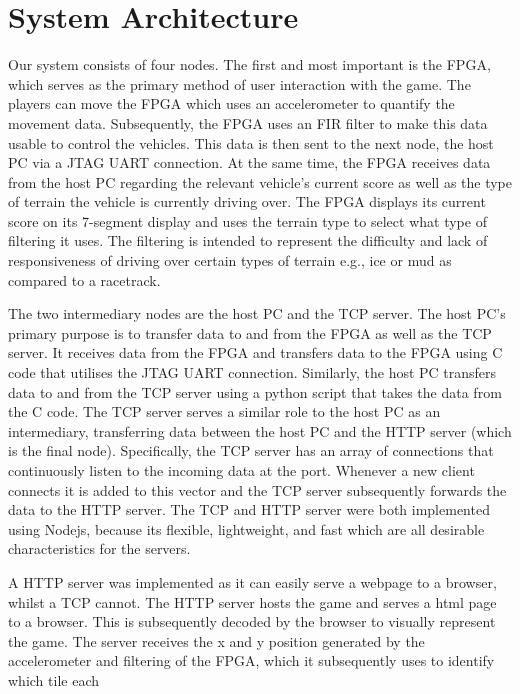 \documentclass[12pt,a4paper]{article}
\begin{document}
\section{\normalsize System Architecture}

{\scriptsize Our system consists of four nodes. The first and most important is the 
FPGA, which serves as the primary method of user interaction with the 
game. The players can move the FPGA which uses an accelerometer to quantify 
the movement data. Subsequently, the FPGA uses an FIR filter to make this 
data usable to control the vehicles. This data is then sent to the next node, 
the host PC via a JTAG UART connection. At the same time, the FPGA receives 
data from the host PC regarding the relevant vehicle’s current score as well 
as the type of terrain the vehicle is currently driving over. The FPGA displays 
its current score on its 7-segment display and uses the terrain type to select 
what type of filtering it uses. The filtering is intended to represent the 
difficulty and lack of responsiveness of driving over certain types of terrain 
e.g., ice or mud as compared to a racetrack.
\par
The two intermediary nodes are the host PC and the TCP server. The host PC’s 
primary purpose is to transfer data to and from the FPGA as well as the TCP 
server. It receives data from the FPGA and transfers data to the FPGA using 
C code that utilises the JTAG UART connection. Similarly, the host PC transfers 
data to and from the TCP server using a python script that takes the data from 
the C code. The TCP server serves a similar role to the host PC as an intermediary, 
transferring data between the host PC and the HTTP server (which is the final node). 
Specifically, the TCP server has an array of connections that continuously listen 
to the incoming data at the port. Whenever a new client connects it is added to 
this vector and the TCP server subsequently forwards the data to the HTTP server. 
The TCP and HTTP server were both implemented using Nodejs, because its flexible, 
lightweight, and fast which are all desirable characteristics for the servers.   
\par
A HTTP server was implemented as it can easily serve a webpage to a browser, 
whilst a TCP cannot. The HTTP server hosts the game and serves a html page to 
a browser. This is subsequently decoded by the browser to visually represent 
the game. The server receives the x and y position generated by the accelerometer 
and filtering of the FPGA, which it subsequently uses to identify which tile each 
}
\end{document}
